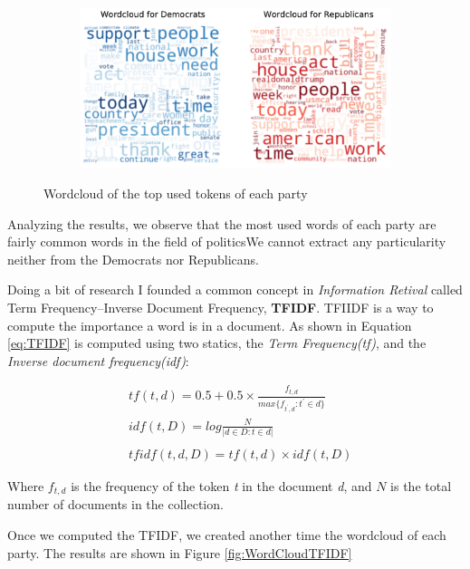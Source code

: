 \documentclass{article}
\begin{document}
\begin{figure}[H]
    \centering
    \begin{subfigure}{.8\textwidth}
        \centering
        \includegraphics[width=1\textwidth]{./img/WordCloud100.pdf}
    \end{subfigure}
    \caption{Wordcloud of the top used tokens of each party}
    \label{fig:WordCloud100}
\end{figure}

Analyzing the results, we observe that the most used words of each party are fairly common words in the field of politicsWe cannot extract any particularity neither from the Democrats nor Republicans.

Doing a bit of research I founded a common concept in \textit{Information Retival} called Term Frequency–Inverse Document Frequency, \textbf{TFIDF}. TFIIDF is a way to compute the importance a word is in a document. As shown in Equation \ref{eq:TFIDF} is computed using two statics, the \textit{Term Frequency(tf)}, and the \textit{Inverse document frequency(idf)}:

\begin{equation} \label{eq:TFIDF}
    \begin{split}
        & tf(t,d) = 0.5 + 0.5\times \frac{f_{t,d}}{max\{f_{t^{'},d}: t^{'} \in d\}} \\
        & idf(t,D) = log \frac{N}{|d\in D:t\in d|} \\ \\
        & tfidf(t,d,D)  = tf(t,d)\times idf(t,D) 
    \end{split}
\end{equation}

Where $f_{t,d}$ is the frequency of the token \textit{t} in the document \textit{d}, and $N$ is the total number of documents in the collection.

Once we computed the TFIDF, we created another time the wordcloud of each party. The results are shown in Figure \ref{fig:WordCloudTFIDF}
\end{document}
